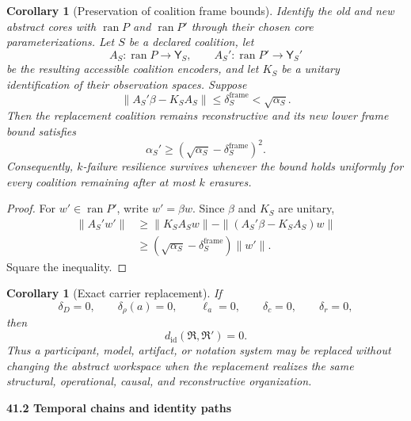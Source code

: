 \documentclass[11pt,letterpaper]{article}
\DeclareMathOperator{\ran}{ran}
\newcommand{\subtopic}[1]{%
 \vspace{0.45em}
 {\bfseries\color{AccentColor} #1\par}
}
\theoremstyle{plain}
\newtheorem{corollary}[theorem]{Corollary}
\theoremstyle{definition}
\begin{document}
\begin{corollary}[Preservation of coalition frame bounds]
\label{cor:replacement-frame-bound}
Identify the old and new abstract cores with \(\ran P\) and \(\ran P'\)
through their chosen core parameterizations. Let \(S\) be a declared coalition,
let
\[
A_S:\ran P\to\mathsf Y_S,
\qquad
A_S':\ran P'\to\mathsf Y_S'
\]
be the resulting accessible coalition encoders, and let \(K_S\) be a unitary
identification of their observation spaces. Suppose
\[
\|A_S'\beta-K_SA_S\|
\leq
\delta_{S}^{\mathrm{frame}}
<
\sqrt{\alpha_S}.
\]
Then the replacement coalition remains reconstructive and its new lower frame
bound satisfies
\[
\boxed{
\alpha_S'
\geq
\left(
\sqrt{\alpha_S}-\delta_{S}^{\mathrm{frame}}
\right)^2.
}
\]
Consequently, \(k\)-failure resilience survives whenever the bound holds
uniformly for every coalition remaining after at most \(k\) erasures.
\end{corollary}

\begin{proof}
For \(w'\in\ran P'\), write \(w'=\beta w\). Since \(\beta\) and \(K_S\) are
unitary,
\[
\begin{aligned}
\|A_S'w'\|
&\geq
\|K_SA_Sw\|
-
\|(A_S'\beta-K_SA_S)w\|\\
&\geq
\left(
\sqrt{\alpha_S}-\delta_{S}^{\mathrm{frame}}
\right)\|w'\|.
\end{aligned}
\]
Square the inequality.
\end{proof}

\begin{corollary}[Exact carrier replacement]\label{cor:exact-carrier-replacement}
If
\[
\delta_D=0,
\qquad
\delta_\rho(a)=0,
\qquad
\ell_a=0,
\qquad
\delta_c=0,
\qquad
\delta_r=0,
\]
then
\[
d_{\mathrm{id}}(\mathfrak R,\mathfrak R')=0.
\]
Thus a participant, model, artifact, or notation system may be replaced without
changing the abstract workspace when the replacement realizes the same
structural, operational, causal, and reconstructive organization.
\end{corollary}

\subtopic{41.2 Temporal chains and identity paths}
\end{document}
